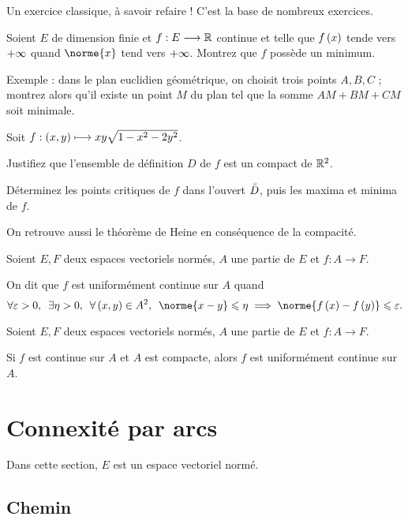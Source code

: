 \begin{exo}
Un exercice classique, à savoir refaire ! C'est la base de nombreux exercices.

Soient \(E\) de dimension finie et \(f:E\longrightarrow\mathbb{R}\) continue et telle que \(f\left(x\right)\) tende vers \(+\infty\) quand \(\norme{x}\) tend vers \(+\infty\). Montrez que \(f\) possède un minimum.

Exemple : dans le plan euclidien géométrique, on choisit trois points \(A,B,C\) ; montrez alors qu'il existe un point \(M\) du plan tel que la somme \(AM+BM+CM\) soit minimale.
\end{exo}

\begin{exo}
Soit \(f:\left(x,y\right)\longmapsto xy\sqrt{1-x^2-2y^2}\).

Justifiez que l'ensemble de définition \(D\) de \(f\) est un compact de \(\mathbb{R}^2\).

Déterminez les points critiques de \(f\) dans l'ouvert \(\accentset{\circ}{D}\), puis les maxima et minima de \(f\).
\end{exo}

On retrouve aussi le théorème de Heine en conséquence de la compacité.

\begin{defi}
Soient \(E,F\) deux espaces vectoriels normés, \(A\) une partie de \(E\) et \(f:A\to F\).

On dit que \(f\) est uniformément continue sur \(A\) quand \[\quantifs{\forall\epsilon>0;\exists\eta>0;\forall\paren{x,y}\in A^2}\norme{x-y}\leq\eta\imp\norme{f\paren{x}-f\paren{y}}\leq\epsilon.\]
\end{defi}

\begin{theo}
Soient \(E,F\) deux espaces vectoriels normés, \(A\) une partie de \(E\) et \(f:A\to F\).

Si \(f\) est continue sur \(A\) et \(A\) est compacte, alors \(f\) est uniformément continue sur \(A\).
\end{theo}

\section{Connexité par arcs}

Dans cette section, \(E\) est un espace vectoriel normé.

\subsection{Chemin}

